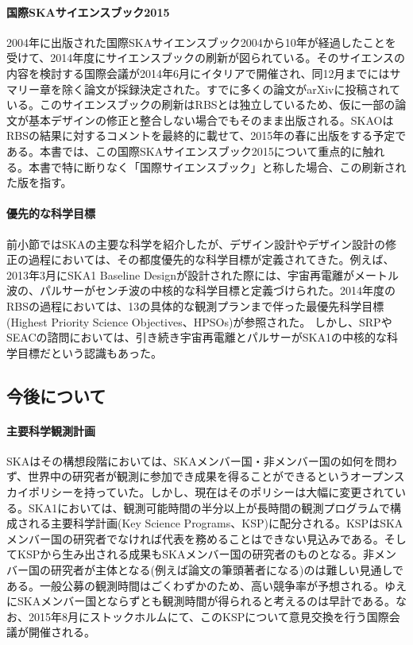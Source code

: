 \paragraph{国際SKAサイエンスブック2015} 

2004年に出版された国際SKAサイエンスブック2004から10年が経過したことを受けて、2014年度にサイエンスブックの刷新が図られている。そのサイエンスの内容を検討する国際会議が2014年6月にイタリアで開催され、同12月までにはサマリー章を除く論文が採録決定された。すでに多くの論文がarXivに投稿されている。このサイエンスブックの刷新はRBSとは独立しているため、仮に一部の論文が基本デザインの修正と整合しない場合でもそのまま出版される。SKAOはRBSの結果に対するコメントを最終的に載せて、2015年の春に出版をする予定である。本書では、この国際SKAサイエンスブック2015について重点的に触れる。本書で特に断りなく「国際サイエンスブック」と称した場合、この刷新された版を指す。

\paragraph{優先的な科学目標}

前小節ではSKAの主要な科学を紹介したが、デザイン設計やデザイン設計の修正の過程においては、その都度優先的な科学目標が定義されてきた。例えば、2013年3月にSKA1 Baseline Designが設計された際には、宇宙再電離がメートル波の、パルサーがセンチ波の中核的な科学目標と定義づけられた。2014年度のRBSの過程においては、13の具体的な観測プランまで伴った最優先科学目標(Highest Priority Science Objectives、HPSOs)が参照された。
しかし、SRPやSEACの諮問においては、引き続き宇宙再電離とパルサーがSKA1の中核的な科学目標だという認識もあった。


\subsection{今後について}
\label{c01.s2.ss4}

\paragraph{主要科学観測計画} 

SKAはその構想段階においては、SKAメンバー国・非メンバー国の如何を問わず、世界中の研究者が観測に参加でき成果を得ることができるというオープンスカイポリシーを持っていた。しかし、現在はそのポリシーは大幅に変更されている。SKA1においては、観測可能時間の半分以上が長時間の観測プログラムで構成される主要科学計画(Key Science Programs、KSP)に配分される。KSPはSKAメンバー国の研究者でなければ代表を務めることはできない見込みである。そしてKSPから生み出される成果もSKAメンバー国の研究者のものとなる。非メンバー国の研究者が主体となる(例えば論文の筆頭著者になる)のは難しい見通しである。一般公募の観測時間はごくわずかのため、高い競争率が予想される。ゆえにSKAメンバー国とならずとも観測時間が得られると考えるのは早計である。なお、2015年8月にストックホルムにて、このKSPについて意見交換を行う国際会議が開催される。

